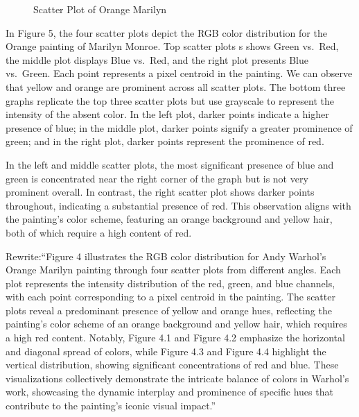 \documentclass{article}
\begin{document}
\begin{figure}[ht]
  \caption{Scatter Plot of Orange Marilyn}
  \label{fig:orange_marilyn_scatter}
\end{figure}

In Figure 5, the four scatter plots depict the RGB color distribution
for the Orange painting of Marilyn Monroe. Top scatter plots s shows
Green vs.~Red, the middle plot displays Blue vs.~Red, and the right plot
presents Blue vs.~Green. Each point represents a pixel centroid in the
painting. We can observe that yellow and orange are prominent across all
scatter plots. The bottom three graphs replicate the top three scatter
plots but use grayscale to represent the intensity of the absent color.
In the left plot, darker points indicate a higher presence of blue; in
the middle plot, darker points signify a greater prominence of green;
and in the right plot, darker points represent the prominence of red.

In the left and middle scatter plots, the most significant presence of
blue and green is concentrated near the right corner of the graph but is
not very prominent overall. In contrast, the right scatter plot shows
darker points throughout, indicating a substantial presence of red. This
observation aligns with the painting's color scheme, featuring an orange
background and yellow hair, both of which require a high content of red.

Rewrite:``Figure 4 illustrates the RGB color distribution for Andy
Warhol's Orange Marilyn painting through four scatter plots from
different angles. Each plot represents the intensity distribution of the
red, green, and blue channels, with each point corresponding to a pixel
centroid in the painting. The scatter plots reveal a predominant
presence of yellow and orange hues, reflecting the painting's color
scheme of an orange background and yellow hair, which requires a high
red content. Notably, Figure 4.1 and Figure 4.2 emphasize the horizontal
and diagonal spread of colors, while Figure 4.3 and Figure 4.4 highlight
the vertical distribution, showing significant concentrations of red and
blue. These visualizations collectively demonstrate the intricate
balance of colors in Warhol's work, showcasing the dynamic interplay and
prominence of specific hues that contribute to the painting's iconic
visual impact.''
\end{document}
